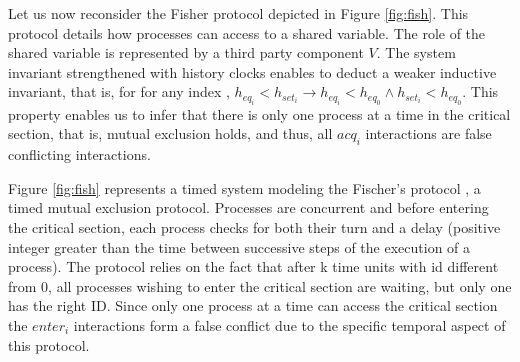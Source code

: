 \begin{example}
  Let us now reconsider the Fisher protocol depicted in Figure \ref{fig:fish}. This protocol
  details how processes can access to a shared variable. The role of the shared variable 
  is represented by a third party component $V$. The system invariant strengthened with 
  history clocks enables to deduct a weaker inductive invariant, that is, for for any index 
  , $h_{eq_i} < h_{set_i} \to h_{eq_i} < h_{eq_0} \wedge h_{set_i} < h_{eq_0}$.
  This property enables us to infer that there is only one process at a time in the critical
  section, that is, mutual exclusion holds, and thus, all $acq_i$ interactions 
  are false conflicting interactions.
\end{example}
\begin{example}
  Figure \ref{fig:fish} represents a timed system modeling the Fischer's protocol \cite{uppaal}, a timed 
  mutual exclusion protocol.
  Processes are concurrent and before entering the critical section, each process checks for
  both their turn and a delay (positive integer greater than the time between successive steps
  of the execution of a process).  
  The protocol relies on the fact that after k time units with id different from 0,
  all processes wishing to enter the critical section are waiting,
  but only one has the right ID. Since only one process at a time can access the critical section
  the $enter_i$ interactions form a false conflict due to the specific temporal aspect of this protocol.
\end{example}

